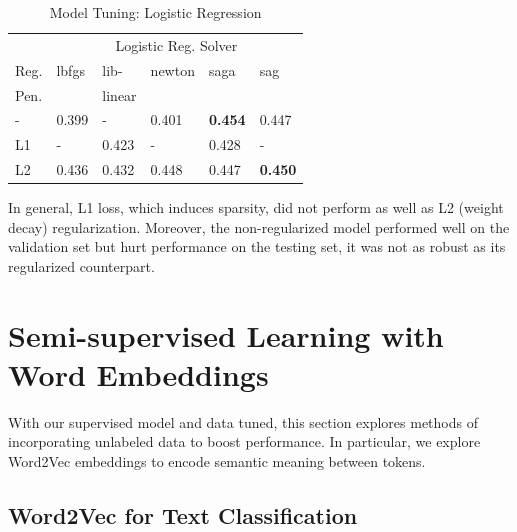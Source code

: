 \documentclass[11pt,a4paper]{article}
\begin{document}
\begin{table}[h]
    \centering
    \caption{Model Tuning: Logistic Regression}
    \begin{tabular}{
    	l
        l
        l
        l
        l
        l
        }
        \toprule
        \multicolumn{1}{c}{} &
        \multicolumn{5}{c}{Logistic Reg. Solver}\\
        \cmidrule(lr){2-6} 
        {Reg.}& {lbfgs} &{lib-} &{newton}&{saga}& {sag}\\
        {Pen.} & {} &{linear}& {}&&{}\\
        \midrule
        - & 0.399 & - & 0.401 & \textbf{0.454} & 0.447\\
        L1 & - & 0.423 &  -&0.428& -\\
        L2 & 0.436& 0.432& 0.448& 0.447& \textbf{0.450}\\
        \bottomrule
    \end{tabular}
\end{table}

In general, L1 loss, which induces sparsity, did not perform as well as L2 (weight decay) regularization. Moreover, the non-regularized model performed well on the validation set but hurt performance on the testing set, it was not as robust as its regularized counterpart. 

\section{Semi-supervised Learning with Word Embeddings}%
\label{sec:semi_supervised_learning_with_word_embeddings}

With our supervised model and data tuned, this section explores methods of incorporating unlabeled data to boost performance. In particular, we explore Word2Vec 
embeddings to encode semantic meaning between tokens.
\subsection{Word2Vec for Text Classification}%
\label{sub:word2vec_for_text_classification}
\end{document}
